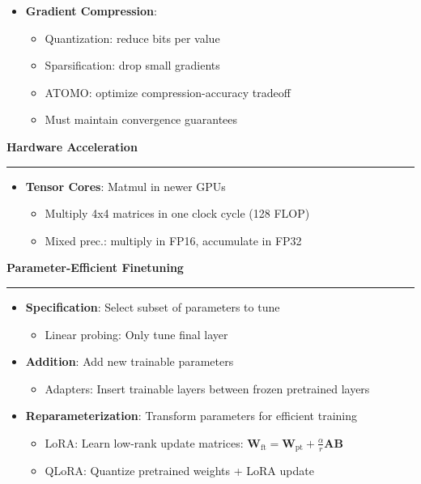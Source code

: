 \documentclass[8pt,letter,landscape]{article}
\newcommand{\sectiontitle}[1]{\textbf{\large #1}\vspace{0.2em}\hrule\vspace{0.5em}}
\begin{document}
\begin{multicols*}{3}
\begin{itemize}[leftmargin=*,nosep]
    \item \textbf{Gradient Compression}:
    \begin{itemize}[leftmargin=*,nosep]
        \item Quantization: reduce bits per value
        \item Sparsification: drop small gradients
        \item ATOMO: optimize compression-accuracy tradeoff
        \item Must maintain convergence guarantees
    \end{itemize}
\end{itemize}

\sectiontitle{Hardware Acceleration}
\begin{itemize}[leftmargin=*,nosep]
    \item \textbf{Tensor Cores}: Matmul in newer GPUs
    \begin{itemize}[leftmargin=*,nosep]
        \item Multiply 4x4 matrices in one clock cycle (128 FLOP)
        \item Mixed prec.: multiply in FP16, accumulate in FP32
    \end{itemize}
\end{itemize}

\sectiontitle{Parameter-Efficient Finetuning}
\begin{itemize}[leftmargin=*,nosep]
    \item \textbf{Specification}: Select subset of parameters to tune
    \begin{itemize}[leftmargin=*,nosep]
        \item Linear probing: Only tune final layer
    \end{itemize}
    \item \textbf{Addition}: Add new trainable parameters
    \begin{itemize}[leftmargin=*,nosep]
        \item Adapters: Insert trainable layers between frozen pretrained layers
    \end{itemize}
    \item \textbf{Reparameterization}: Transform parameters for efficient training
    \begin{itemize}[leftmargin=*,nosep]
        \item LoRA: Learn low-rank update matrices: $\mathbf{W}_{\text{ft}} = \mathbf{W}_{\text{pt}} + \frac{\alpha}{r}\mathbf{AB}$
        \item QLoRA: Quantize pretrained weights + LoRA update
    \end{itemize}
\end{itemize}


\end{multicols*}
\end{document}

